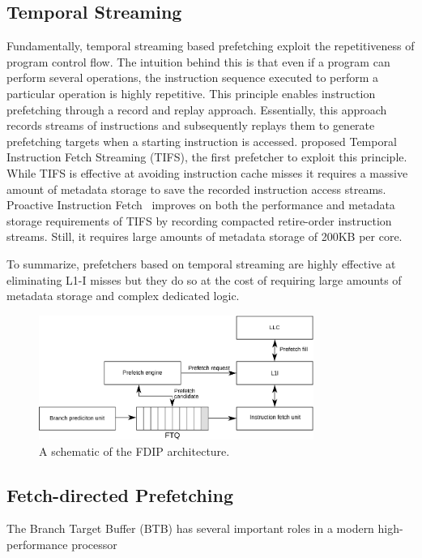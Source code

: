 \documentclass[../main.tex]{subfiles}
\begin{document}
\begin{refsection}
\subsection{Temporal Streaming} Fundamentally, temporal streaming
based prefetching exploit the repetitiveness of program control
flow. The intuition behind this is that even if a program can perform
several operations, the instruction sequence executed to perform a
particular operation is highly repetitive. This principle enables
instruction prefetching through a record and replay
approach. Essentially, this approach records streams of instructions
and subsequently replays them to generate prefetching targets when a
starting instruction is accessed. \textcite{ferdman08_tempor} proposed
Temporal Instruction Fetch Streaming (TIFS), the first prefetcher to
exploit this principle. While TIFS is effective at avoiding
instruction cache misses it requires a massive amount of metadata
storage to save the recorded instruction access streams.  Proactive
Instruction Fetch~\cite{ferdman11_proac_instr_fetch} improves on both
the performance and metadata storage requirements of TIFS by recording
compacted retire-order instruction streams. Still, it requires large
amounts of metadata storage of 200KB per core.  %

To summarize, prefetchers based on temporal streaming are highly
effective at eliminating L1-I misses but they do so at the cost of
requiring large amounts of metadata storage and complex dedicated
logic.

\begin{figure}[ht]
  \centering
  \includegraphics[width=0.8\textwidth]{figures/fdip1.pdf}
  \caption{\label{fig:fdip} A schematic of the FDIP architecture.}
\end{figure}

\subsection{Fetch-directed Prefetching}
The Branch Target Buffer (BTB) has several important roles in a modern high-performance processor 


\end{refsection}
\end{document}
